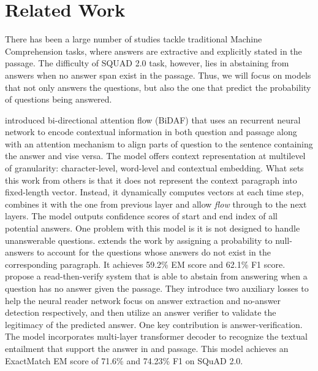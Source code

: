 \section{Related Work}

There has been a large number of studies tackle traditional Machine Comprehension tasks, where answers are extractive and explicitly stated in the passage. The difficulty of SQUAD 2.0 task, however, lies in abstaining from answers when no answer span exist in the passage. Thus, we will focus on models that not only answers the questions, but also the one that predict the probability of questions being answered.  


\citep{DBLP:journals/corr/SeoKFH16} introduced bi-directional attention flow (BiDAF) that uses an recurrent neural network to encode contextual information in both question and passage along with an attention mechanism to align parts of question to the sentence containing the answer and vise versa. The model offers context representation at multilevel of granularity: character-level, word-level and contextual embedding. What sets this work from others is that it does not represent the context paragraph into fixed-length vector. Instead, it dynamically computes vectors at each time step, combines it with the one from previous layer and allow \textit{flow} through to the next layers. The model outputs confidence scores of start and end index of all potential answers. One problem with this model is it is not designed to handle unanswerable questions. \citep{DBLP:journals/corr/LevySCZ17} extends the work by assigning a probability to null-answers to account for the questions whose answers do not exist in the corresponding paragraph. It achieves 59.2\% EM score and 62.1\% F1 score.\\

\citep{DBLP:journals/corr/abs-1808-05759} propose a read-then-verify system that is able to abstain from answering when a question has no answer given the passage. They introduce two auxiliary losses to help the neural reader network focus on answer extraction and no-answer detection respectively, and then utilize an answer verifier to validate the legitimacy of the predicted answer. One key contribution is answer-verification. The model incorporates multi-layer transformer decoder to recognize the textual entailment that support the answer in and passage. This model achieves an ExactMatch EM score of 71.6\% and 74.23\% F1 on SQuAD 2.0. \\

